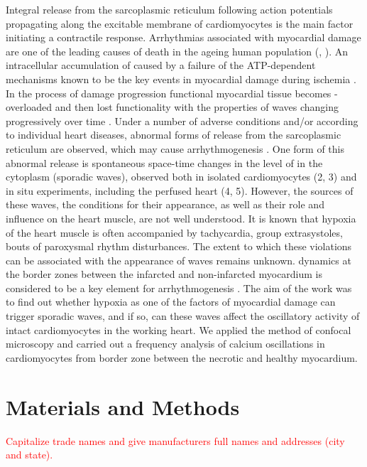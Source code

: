 \documentclass{biophys-new}
\begin{document}
Integral  release from the sarcoplasmic reticulum following action potentials propagating along the excitable membrane of cardiomyocytes is the main factor initiating a contractile response.
Arrhythmias associated with myocardial damage are one of the leading causes of death in the ageing human population (\cite{xiao2011cardiac}, \cite{}).
An intracellular accumulation of  caused by a failure of the ATP-dependent mechanisms known to be the key events in myocardial damage during ischemia \cite{shen1972myocardial,shen1972kinetics,nayler1981role}.
In the process of damage progression functional myocardial tissue becomes -overloaded and then lost functionality with the properties of  waves changing progressively over time \cite{minamikawa1997situ,hama1998real}.
Under a number of adverse conditions and/or according to individual heart diseases, abnormal forms of  release from the sarcoplasmic reticulum are observed, which may cause arrhythmogenesis \cite{ishide1990propagation}.
One form of this abnormal release is spontaneous space-time changes in the level of  in the cytoplasm (sporadic  waves), observed both in isolated cardiomyocytes (2, 3) and in situ experiments, including the perfused heart (4, 5).
However, the sources of these waves, the conditions for their appearance, as well as their role and influence on the heart muscle, are not well understood.
It is known that hypoxia of the heart muscle is often accompanied by tachycardia, group extrasystoles, bouts of paroxysmal rhythm disturbances.
The extent to which these violations can be associated with the appearance of  waves remains unknown.
 dynamics at the border zones between the infarcted and non-infarcted myocardium is considered to be a key element for arrhythmogenesis \cite{takamatsu2008arrhythmogenic}.
The aim of the work was to find out whether hypoxia as one of the factors of myocardial damage can trigger sporadic  waves, and if so, can these waves affect the oscillatory activity of intact cardiomyocytes in the working heart.
We applied the method of confocal microscopy and carried out a frequency analysis of calcium oscillations in cardiomyocytes from border zone between the necrotic and healthy myocardium.


\section*{Materials and Methods}

\textcolor{red}{Capitalize trade names and give manufacturers full names and addresses (city and state).}
\end{document}
